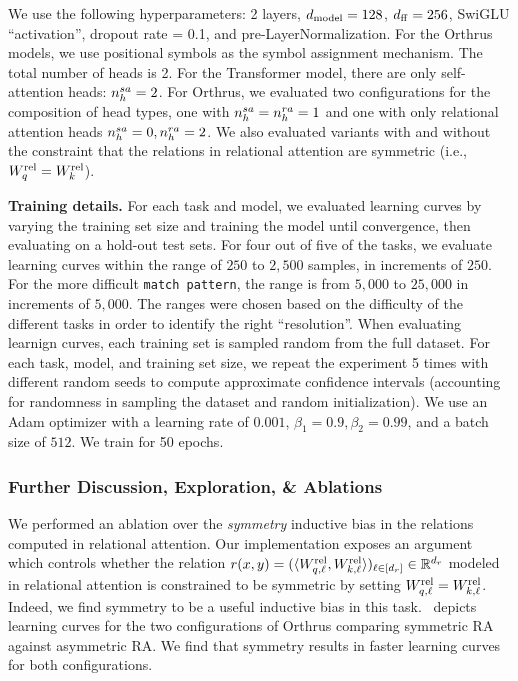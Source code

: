 We use the following hyperparameters: 2 layers, $d_{\mathrm{model}} = 128$, $d_{\mathrm{ff}} = 256$, SwiGLU ``activation'', dropout rate = 0.1, and pre-LayerNormalization. For the Orthrus models, we use positional symbols as the symbol assignment mechanism. The total number of heads is 2. For the Transformer model, there are only self-attention heads: $n_h^{sa} = 2$. For Orthrus, we evaluated two configurations for the composition of head types, one with $n_h^{sa} = n_h^{ra} = 1$ and one with only relational attention heads $n_h^{sa} = 0, n_h^{ra} = 2$. We also evaluated variants with and without the constraint that the relations in relational attention are symmetric (i.e., $W_q^{\mathrm{rel}} = W_k^{\mathrm{rel}}$).

\textbf{Training details.} For each task and model, we evaluated learning curves by varying the training set size and training the model until convergence, then evaluating on a hold-out test sets. For four out of five of the tasks, we evaluate learning curves within the range of $250$ to $2,500$ samples, in increments of $250$. For the more difficult \texttt{match pattern}, the range is from $5,000$ to $25,000$ in increments of $5,000$. The ranges were chosen based on the difficulty of the different tasks in order to identify the right ``resolution''. When evaluating learnign curves, each training set is sampled random from the full dataset. For each task, model, and training set size, we repeat the experiment 5 times with different random seeds to compute approximate confidence intervals (accounting for randomness in sampling the dataset and random initialization). We use an Adam optimizer with a learning rate of $0.001$, $\beta_1 = 0.9, \beta_2 = 0.99$, and a batch size of $512$. We train for 50 epochs.

\subsubsection*{Further Discussion, Exploration, \& Ablations}

We performed an ablation over the \textit{symmetry} inductive bias in the relations computed in relational attention. Our implementation exposes an argument which controls whether the relation $r(x, y) = (\langle W_{q, \ell}^{\mathrm{rel}}, W_{k, \ell}^{\mathrm{rel}} \rangle)_{\ell \in [d_r]} \in \mathbb{R}^{d_r}$ modeled in relational attention is constrained to be symmetric by setting $W_{q, \ell}^{\mathrm{rel}} = W_{k, \ell}^{\mathrm{rel}}$. Indeed, we find symmetry to be a useful inductive bias in this task.~ depicts learning curves for the two configurations of Orthrus comparing symmetric RA against asymmetric RA. We find that symmetry results in faster learning curves for both configurations.

